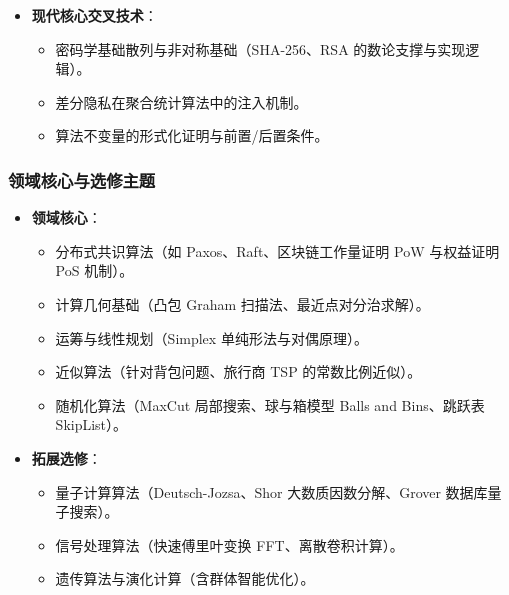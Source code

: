\begin{itemize}
\begin{itemize}
        \item 最小生成树（MST）：Prim 算法与 Kruskal 算法（并查集 Union-Find 的应用）。
        \item 最短路径算法族：单源最短路径 Dijkstra 算法（贪心策略）、Bellman-Ford 算法（负权边检测）；全源最短路径 Floyd-Warshall 算法。
        \item 传递闭包与 Warshall 算法。
    \end{itemize}
    \item \textbf{现代核心交叉技术}：
    \begin{itemize}
        \item 密码学基础散列与非对称基础（SHA-256、RSA 的数论支撑与实现逻辑）。
        \item 差分隐私在聚合统计算法中的注入机制。
        \item 算法不变量的形式化证明与前置/后置条件。
    \end{itemize}
\end{itemize}

\subsubsection{领域核心与选修主题}
\begin{itemize}
    \item \textbf{领域核心}：
    \begin{itemize}
        \item 分布式共识算法（如 Paxos、Raft、区块链工作量证明 PoW 与权益证明 PoS 机制）。
        \item 计算几何基础（凸包 Graham 扫描法、最近点对分治求解）。
        \item 运筹与线性规划（Simplex 单纯形法与对偶原理）。
        \item 近似算法（针对背包问题、旅行商 TSP 的常数比例近似）。
        \item 随机化算法（MaxCut 局部搜索、球与箱模型 Balls and Bins、跳跃表 SkipList）。
    \end{itemize}
    \item \textbf{拓展选修}：
    \begin{itemize}
        \item 量子计算算法（Deutsch-Jozsa、Shor 大数质因数分解、Grover 数据库量子搜索）。
        \item 信号处理算法（快速傅里叶变换 FFT、离散卷积计算）。
        \item 遗传算法与演化计算（含群体智能优化）。
    \end{itemize}
\end{itemize}

